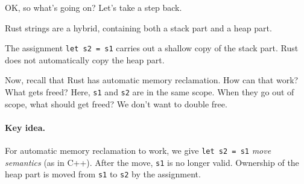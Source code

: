 \documentclass[a4paper]{report}
\begin{document}
OK, so what's going on? Let's take a step back.

Rust strings are a hybrid, containing both a stack part and a heap part.

\begin{center}
\end{center}

The assignment {\tt let s2 = s1} carries out a shallow copy of the stack part. Rust
does not automatically copy the heap part.

Now, recall that Rust has automatic memory reclamation. How can that
work? What gets freed?  Here, {\tt s1} and {\tt s2} are in the same
scope. When they go out of scope, what should get freed? We
don't want to double free.

\paragraph{Key idea.} For automatic memory reclamation to work, we give {\tt let s2 = s1} \emph{move semantics}
(as in C++). After the move, {\tt s1} is no longer valid.
Ownership of the heap part is moved from {\tt s1} to {\tt s2} by the assignment.
\end{document}
